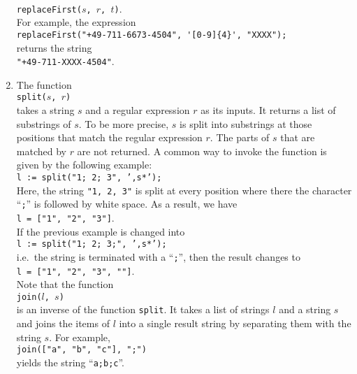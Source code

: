 \begin{enumerate}
      \\[0.2cm]
      \hspace*{1.3cm}
      \texttt{replaceFirst($s$, $r$, $t$)}.
      \\[0.2cm]
      For example, the expression
      \\[0.2cm]
      \hspace*{1.3cm}
      \verb|replaceFirst("+49-711-6673-4504", '[0-9]{4}', "XXXX");| 
      \\[0.2cm]
      returns the string
      \\[0.2cm]
      \hspace*{1.3cm}
      \verb|"+49-711-XXXX-4504"|.
\item The function
      \\[0.2cm]
      \hspace*{1.3cm}
      \texttt{split($s$, $r$)}
      \\[0.2cm]
      takes a string $s$ and a regular expression $r$ as its inputs.  It returns a list of
      substrings of $s$.  To be more precise, $s$ is split into substrings at those positions that
      match the regular expression $r$.  The parts of $s$ that are matched by $r$ are not returned.
      A common way to invoke the function is given by the following example:
      \\[0.2cm]
      \hspace*{1.3cm}
      \texttt{l := split("1; 2; 3", ',s*');}
      \\[0.2cm]
      Here, the string \texttt{"1, 2, 3"} is split at every position where there the character
      ``\texttt{;}'' is followed by white space.  As a result, we have
      \\[0.2cm]
      \hspace*{1.3cm}
      \texttt{l = ["1", "2", "3"]}.
      \\[0.2cm]
      If the previous example is changed into
      \\[0.2cm]
      \hspace*{1.3cm}
      \texttt{l := split("1; 2; 3;", ',s*');}
      \\[0.2cm]
      i.e.~the string is terminated with a ``\texttt{;}'', then the result changes to
      \\[0.2cm]
      \hspace*{1.3cm}
      \texttt{l = ["1", "2", "3", ""]}.
      \\[0.2cm]
      Note that the function 
      \\[0.2cm]
      \hspace*{1.3cm}
      \texttt{join($l$, $s$)}
      \\[0.2cm]
      is an inverse of the function \texttt{split}.  It takes a list of strings $l$ and a string $s$
      and joins the items of $l$ into a single result string by separating them with the string $s$.
      For example,
      \\[0.2cm]
      \hspace*{1.3cm}
      \texttt{join(["a", "b", "c"], ";")}
      \\[0.2cm]
      yields the string ``\texttt{a;b;c}''.
\end{enumerate}




